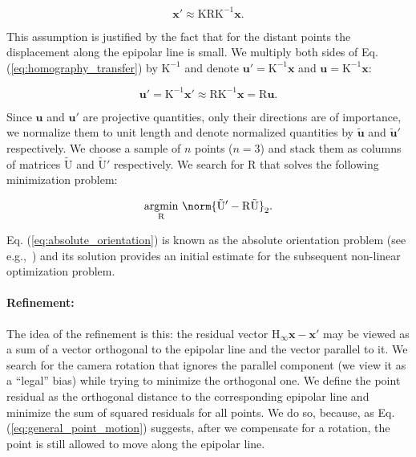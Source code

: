 \begin{equation}\label{eq:homography_transfer}
  \mathbf{x}' \approx \mathrm{KRK^{-1}}\mathbf{x}.
\end{equation}

This assumption is justified by the fact that for the distant points
the displacement along the epipolar line is small. We multiply
both sides of Eq. (\ref{eq:homography_transfer}) by $\mathrm{K^{-1}}$
and denote $\mathbf{u'} = \mathrm{K^{-1}}\mathbf{x}$ and
$\mathbf{u} = \mathrm{K^{-1}}\mathbf{x}$:

\begin{equation}
  \mathbf{u'} = \mathrm{K^{-1}}\mathbf{x}' \approx \mathrm{RK^{-1}}\mathbf{x} = \mathrm{R}\mathbf{u}.
\end{equation}

Since $\mathbf{u}$ and $\mathbf{u}'$ are projective quantities, only
their directions are of importance, we normalize them to unit length
and denote normalized quantities by $\mathbf{\tilde{u}}$ and
$\mathbf{\tilde{u}}'$ respectively. We choose a sample of $n$ points
($n=3$) and stack them as columns of matrices $\mathrm{\tilde{U}}$ and
$\mathrm{\tilde{U}'}$ respectively.  We search for $\mathrm{R}$ that
solves the following minimization problem:

\begin{equation}\label{eq:absolute_orientation}
\underset{\mathrm{R}}{\text{argmin}}\ \norm{\mathrm{\tilde{U}'-R\tilde{U}}}_2.
\end{equation}

Eq. (\ref{eq:absolute_orientation}) is known as the absolute
orientation problem (see e.g.,~\cite{Horn1987}) and its solution
provides an initial estimate for the subsequent non-linear
optimization problem.

\paragraph{Refinement:} The idea of the refinement is this: the
residual vector $\mathrm{H}_\infty\mathbf{x} - \mathbf{x}'$ may be
viewed as a sum of a vector orthogonal to the epipolar line and the
vector parallel to it.  We search for the camera rotation that ignores
the parallel component (we view it as a ``legal'' bias) while trying
to minimize the orthogonal one.  We define the point residual as the
orthogonal distance to the corresponding epipolar line and minimize
the sum of squared residuals for all points.  We do so, because, as
Eq. (\ref{eq:general_point_motion}) suggests, after we compensate for
a rotation, the point is still allowed to move along the epipolar
line.

